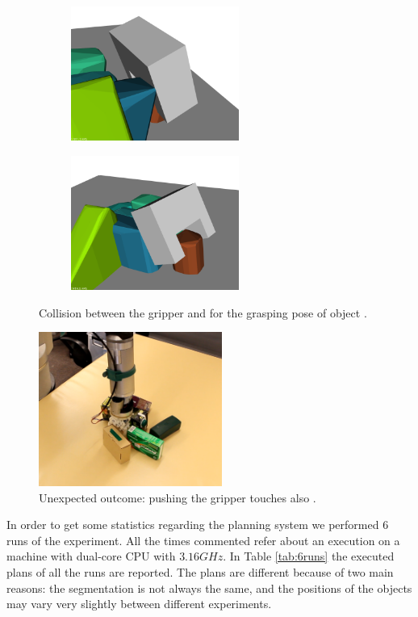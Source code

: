 \begin{figure}
\centering
\begin{subfigure}[t]{0.45\textwidth}
\centering
\includegraphics[width = 5.5cm]{Img/experiments/exp_good/grasp_o2.png}
\caption{}
\end{subfigure}
\begin{subfigure}[t]{0.45\textwidth}
\centering
\includegraphics[width = 5.5cm]{Img/experiments/exp_good/grasp_o2_2.png}
\caption{}
\end{subfigure}
\caption{Collision between the gripper and  for the grasping pose of object .}\label{fig:exp_good_grasp_o2}
\end{figure}

\begin{figure}[tb]
\centering
\includegraphics[width=6cm]{Img/experiments/exp_good/pushing_o0c.png}
\caption{Unexpected outcome: pushing  the gripper touches also .}\label{fig:pushing_o0}
\end{figure}

In order to get some statistics regarding the planning system we performed 6 runs of the experiment. All the times commented refer about an execution on a machine with dual-core CPU with $3.16GHz$. In Table \ref{tab:6runs} the executed plans of all the runs are reported. The plans are different because of two main reasons: the segmentation is not always the same, and  the positions of the objects may vary very slightly between different experiments. 

